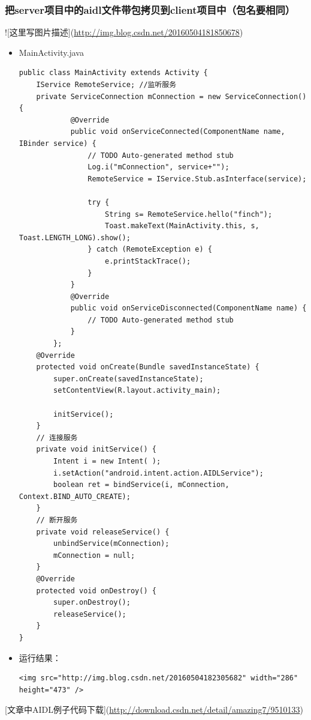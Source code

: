 \documentclass[9pt, b5paper]{article}
\begin{document}
\subsubsection{把server项目中的aidl文件带包拷贝到client项目中（包名要相同）}
\label{sec-17-4-4}
![这里写图片描述](\url{http://img.blog.csdn.net/20160504181850678}) 
\begin{itemize}
\item MainActivity.java
\begin{verbatim}
public class MainActivity extends Activity {
    IService RemoteService; //监听服务
    private ServiceConnection mConnection = new ServiceConnection() {
            @Override
            public void onServiceConnected(ComponentName name, IBinder service) {
                // TODO Auto-generated method stub
                Log.i("mConnection", service+"");
                RemoteService = IService.Stub.asInterface(service);
            
                try {
                    String s= RemoteService.hello("finch");
                    Toast.makeText(MainActivity.this, s, Toast.LENGTH_LONG).show();
                } catch (RemoteException e) {
                    e.printStackTrace();
                }
            }
            @Override
            public void onServiceDisconnected(ComponentName name) {
                // TODO Auto-generated method stub
            }
        };
    @Override
    protected void onCreate(Bundle savedInstanceState) {
        super.onCreate(savedInstanceState);
        setContentView(R.layout.activity_main);
        
        initService();
    }
    // 连接服务
    private void initService() {
        Intent i = new Intent( );
        i.setAction("android.intent.action.AIDLService");
        boolean ret = bindService(i, mConnection, Context.BIND_AUTO_CREATE);
    }
    // 断开服务
    private void releaseService() {
        unbindService(mConnection);
        mConnection = null;
    }
    @Override
    protected void onDestroy() {
        super.onDestroy();
        releaseService();
    }
}
\end{verbatim}
\item 运行结果：
\begin{verbatim}
<img src="http://img.blog.csdn.net/20160504182305682" width="286" height="473" />
\end{verbatim}
\end{itemize}
[文章中AIDL例子代码下载](\url{http://download.csdn.net/detail/amazing7/9510133})
\end{document}
